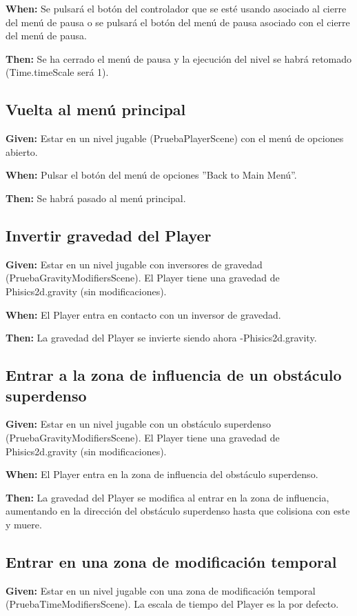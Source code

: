 \textbf{When:} Se pulsará el botón del controlador que se esté usando asociado al cierre del menú de pausa o se pulsará el botón del menú de pausa asociado con el cierre del menú de pausa.

\textbf{Then:} Se ha cerrado el menú de pausa y la ejecución del nivel se habrá retomado (Time.timeScale será 1).

\subsection{Vuelta al menú principal}
\textbf{Given:} Estar en un nivel jugable (PruebaPlayerScene) con el menú de opciones abierto.

\textbf{When:} Pulsar el botón del menú de opciones ''Back to Main Menú''.

\textbf{Then:} Se habrá pasado al menú principal.

\subsection{Invertir gravedad del Player}
\textbf{Given:} Estar en un nivel jugable con inversores de gravedad (PruebaGravityModifiersScene). El Player tiene una gravedad de Phisics2d.gravity (sin modificaciones).

\textbf{When:} El Player entra en contacto con un inversor de gravedad.

\textbf{Then:} La gravedad del Player se invierte siendo ahora -Phisics2d.gravity.

\subsection{Entrar a la zona de influencia de un obstáculo superdenso}
\textbf{Given:} Estar en un nivel jugable con un obstáculo superdenso (PruebaGravityModifiersScene). El Player tiene una gravedad de Phisics2d.gravity (sin modificaciones).

\textbf{When:} El Player entra en la zona de influencia del obstáculo superdenso.

\textbf{Then:} La gravedad del Player se modifica al entrar en la zona de influencia, aumentando en la dirección del obstáculo superdenso hasta que colisiona con este y muere.

\subsection{Entrar en una zona de modificación temporal}
\textbf{Given:} Estar en un nivel jugable con una zona de modificación temporal (PruebaTimeModifiersScene). La escala de tiempo del Player es la por defecto.

